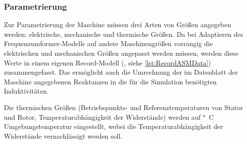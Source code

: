 
\subsubsection{Parametrierung}\label{sec:parametrierung-ASM}

Zur Parametrierung der Maschine müssen drei Arten von Größen angegeben werden: elektrische, mechanische und thermische Größen. Da bei Adaptieren des Fre­quenz­um­for­mer-Modells auf andere Maschinengrößen vorrangig die elektrischen und mechanischen Größen angepasst werden müssen, werden diese Werte in einem eigenen Record-Modell (, siehe \cref{lst:RecordASMData}) zusammengefasst. Das ermöglicht auch die Umrechnung der im Datenblatt der Maschine angegebenen Reaktanzen in die für die Simulation benötigten Induktivitäten.

Die thermischen Größen (Betriebspunkts- und Referenztemperaturen von Stator und Rotor, Temperaturabhängigkeit der Widerstände) werden auf \unit[20]{°C} Umgebungstemperatur eingestellt, wobei die Temperaturabhängigkeit der Widerstände vernachlässigt werden soll.

